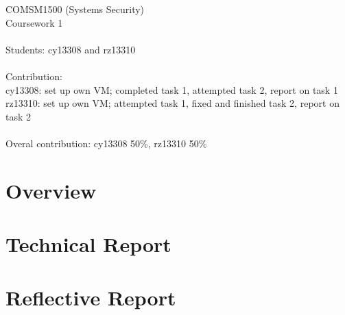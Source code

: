 \documentclass[12pt, onecolumn]{IEEEtran}
\newcommand\tab[1][1cm]{\hspace*{#1}}
\begin{document}
COMSM1500 (Systems Security)\\
Coursework 1\\
\\
Students: cy13308 and rz13310 \\
\\
Contribution: \\
\tab[1cm] cy13308: set up own VM; completed task 1, attempted task 2, report on task 1\\
\tab[1cm] rz13310: set up own VM; attempted task 1, fixed and finished task 2, report on task 2
\\
\\
Overal contribution: cy13308 50\%, rz13310 50\%
\newpage

\section{Overview}

\newpage

\section{Technical Report}

\newpage

\newpage

\section{Reflective Report}

\newpage




% 
% 
\end{document}
